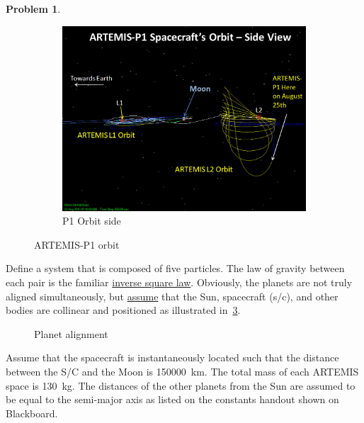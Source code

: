 \documentclass[10pt]{article}
\theoremstyle{definition}
\newtheorem{prob}{Problem}[section]
\begin{document}
\begin{prob}
\begin{figure}[htbp]
\begin{subfigure}[htbp]{0.5\textwidth}
            \includegraphics[width=\textwidth, keepaspectratio]{figures/artemis_side.jpg} 
            \caption{P1 Orbit side \label{fig:side_view}} 
        \end{subfigure} 
        \caption{ARTEMIS-P1 orbit~\label{fig:artemis}}
    \end{figure}
    
    Define a system that is composed of five particles.
    The law of gravity between each pair is the familiar \underline{inverse square law}.
    Obviously, the planets are not truly aligned simultaneously, but \underline{assume} that the Sun, spacecraft (s/c), and other bodies are collinear and positioned as illustrated in~\cref{fig:planets}.
    \begin{figure}[htbp]
        \centering
        \caption{Planet alignment~\label{fig:planets}}
    \end{figure}
    Assume that the spacecraft is instantaneously located such that the distance between the S/C and the Moon is \SI{150000}{\kilo\meter}.
    The total mass of each ARTEMIS space is \SI{130}{\kilo\gram}.
    The distances of the other planets from the Sun are assumed to be equal to the semi-major axis as listed on the constants handout shown on Blackboard.


\end{prob}
\end{document}
